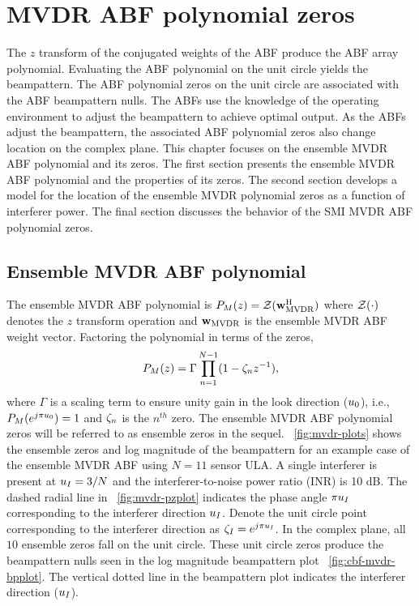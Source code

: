 \chapter{MVDR ABF polynomial zeros }
\label{ch:mvdr-polyn-zeros}
The $z$ transform of the conjugated weights of the ABF produce the ABF
array polynomial. Evaluating the ABF polynomial on the unit circle
yields the beampattern. The ABF polynomial zeros on the unit circle
are associated with the ABF beampattern nulls. The ABFs use the
knowledge of the operating environment to adjust the beampattern to
achieve optimal output. As the ABFs adjust the beampattern, the
associated ABF polynomial zeros also change location on the complex
plane. This chapter focuses on the ensemble MVDR ABF polynomial and
its zeros. The first section presents the ensemble MVDR ABF polynomial
and the properties of its zeros. The second section develops a model
for the location of the ensemble MVDR polynomial zeros as a function
of interferer power. The final section discusses the behavior of the
SMI MVDR ABF polynomial zeros.

\section{Ensemble MVDR ABF polynomial}
\label{sec:mvdr-polynomial}
The ensemble MVDR ABF polynomial is
${P}_M(z) = \mathcal{Z}({\bf w}_{\rm MVDR}^{\rm H})$ where $\mathcal{Z}(\cdot)$ denotes
the $z$ transform operation and ${\bf w}_{\rm MVDR}$ is the ensemble MVDR ABF
weight vector. Factoring the polynomial in terms of the zeros,
\[
{P}_M(z)  =  \Gamma \prod\limits_{n=1}^{N-1}(1 - \zeta_n z^{-1}),
\]
where $\Gamma$ is a scaling term to ensure unity gain in the look
direction ($u_0$), i.e., ${P}_M(e^{j\pi u_0}) = 1$ and
$\zeta_n$ is the $n^{th}$ zero. The ensemble MVDR ABF polynomial zeros
will be referred to as ensemble zeros in the
sequel. \figurename{}~\ref{fig:mvdr-plots} shows the ensemble zeros
and log magnitude of the beampattern for an example case of the
ensemble MVDR ABF using $N = 11$ sensor ULA. A single interferer is
present at $u_I = 3/N$ and the interferer-to-noise power ratio
(INR) is 10 dB. The dashed radial line in
\figurename{}~\ref{fig:mvdr-pzplot} indicates the phase angle
$\pi u_I$ corresponding to the interferer direction
$u_I$. Denote the unit circle point corresponding to the
interferer direction as $\zeta_I = e^{j\pi u_I}$. In the complex
plane, all $10$ ensemble zeros fall on the unit circle. These unit
circle zeros produce the beampattern nulls seen in the log magnitude
beampattern plot \figurename{}~\ref{fig:cbf-mvdr-bpplot}. The vertical
dotted line in the beampattern plot indicates the interferer direction
($u_I$).


